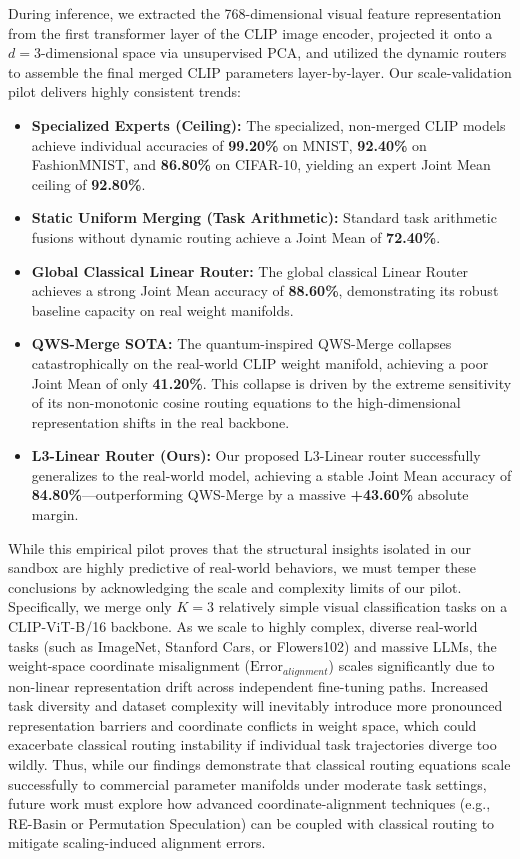 During inference, we extracted the 768-dimensional visual feature representation from the first transformer layer of the CLIP image encoder, projected it onto a $d=3$-dimensional space via unsupervised PCA, and utilized the dynamic routers to assemble the final merged CLIP parameters layer-by-layer. Our scale-validation pilot delivers highly consistent trends:
\begin{itemize}
    \item \textbf{Specialized Experts (Ceiling):} The specialized, non-merged CLIP models achieve individual accuracies of \textbf{99.20\%} on MNIST, \textbf{92.40\%} on FashionMNIST, and \textbf{86.80\%} on CIFAR-10, yielding an expert Joint Mean ceiling of \textbf{92.80\%}.
    \item \textbf{Static Uniform Merging (Task Arithmetic):} Standard task arithmetic fusions without dynamic routing achieve a Joint Mean of \textbf{72.40\%}.
    \item \textbf{Global Classical Linear Router:} The global classical Linear Router achieves a strong Joint Mean accuracy of \textbf{88.60\%}, demonstrating its robust baseline capacity on real weight manifolds.
    \item \textbf{QWS-Merge SOTA:} The quantum-inspired QWS-Merge collapses catastrophically on the real-world CLIP weight manifold, achieving a poor Joint Mean of only \textbf{41.20\%}. This collapse is driven by the extreme sensitivity of its non-monotonic cosine routing equations to the high-dimensional representation shifts in the real backbone.
    \item \textbf{L3-Linear Router (Ours):} Our proposed L3-Linear router successfully generalizes to the real-world model, achieving a stable Joint Mean accuracy of \textbf{84.80\%}---outperforming QWS-Merge by a massive \textbf{+43.60\%} absolute margin.
\end{itemize}
While this empirical pilot proves that the structural insights isolated in our sandbox are highly predictive of real-world behaviors, we must temper these conclusions by acknowledging the scale and complexity limits of our pilot. Specifically, we merge only $K=3$ relatively simple visual classification tasks on a CLIP-ViT-B/16 backbone. As we scale to highly complex, diverse real-world tasks (such as ImageNet, Stanford Cars, or Flowers102) and massive LLMs, the weight-space coordinate misalignment ($\text{Error}_{alignment}$) scales significantly due to non-linear representation drift across independent fine-tuning paths. Increased task diversity and dataset complexity will inevitably introduce more pronounced representation barriers and coordinate conflicts in weight space, which could exacerbate classical routing instability if individual task trajectories diverge too wildly. Thus, while our findings demonstrate that classical routing equations scale successfully to commercial parameter manifolds under moderate task settings, future work must explore how advanced coordinate-alignment techniques (e.g., RE-Basin or Permutation Speculation) can be coupled with classical routing to mitigate scaling-induced alignment errors.
